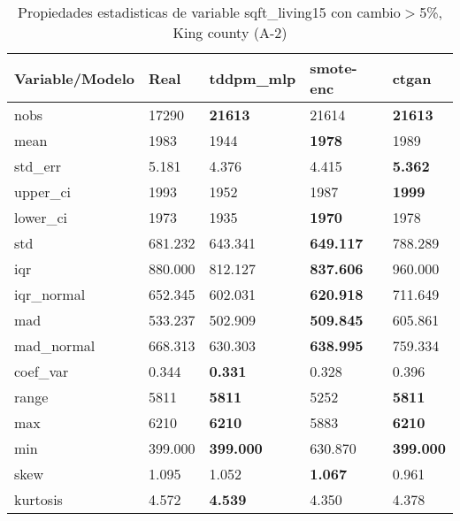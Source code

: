 \begin{table}[H]
\centering
\fontsize{8}{14}\selectfont
\caption{Propiedades estadisticas de variable sqft\_living15 con cambio\ensuremath{>}5\%, King county (A-2)}
\label{table-stats-king county-a-2-sqft_living15-short}
\begin{tabular}{|l|m{10em}|m{10em}|m{10em}|m{10em}|}
\hline
 \rowcolor[gray]{0.8}
Variable/Modelo & Real & tddpm\_mlp & smote-enc & ctgan \\
\hline nobs & 17290 & \bfseries 21613 & \cellcolor[rgb]{0.9, 0.54, 0.52} 21614 & \bfseries 21613 \\
\hline mean & 1983 & \cellcolor[rgb]{0.9, 0.54, 0.52} 1944 & \bfseries 1978 & 1989 \\
\hline std\_err & 5.181 & \cellcolor[rgb]{0.9, 0.54, 0.52} 4.376 & 4.415 & \bfseries 5.362 \\
\hline upper\_ci & 1993 & \cellcolor[rgb]{0.9, 0.54, 0.52} 1952 & 1987 & \bfseries 1999 \\
\hline lower\_ci & 1973 & \cellcolor[rgb]{0.9, 0.54, 0.52} 1935 & \bfseries 1970 & 1978 \\
\hline std & 681.232 & 643.341 & \bfseries 649.117 & \cellcolor[rgb]{0.9, 0.54, 0.52} 788.289 \\
\hline iqr & 880.000 & 812.127 & \bfseries 837.606 & \cellcolor[rgb]{0.9, 0.54, 0.52} 960.000 \\
\hline iqr\_normal & 652.345 & 602.031 & \bfseries 620.918 & \cellcolor[rgb]{0.9, 0.54, 0.52} 711.649 \\
\hline mad & 533.237 & 502.909 & \bfseries 509.845 & \cellcolor[rgb]{0.9, 0.54, 0.52} 605.861 \\
\hline mad\_normal & 668.313 & 630.303 & \bfseries 638.995 & \cellcolor[rgb]{0.9, 0.54, 0.52} 759.334 \\
\hline coef\_var & 0.344 & \bfseries 0.331 & 0.328 & \cellcolor[rgb]{0.9, 0.54, 0.52} 0.396 \\
\hline range & 5811 & \bfseries 5811 & \cellcolor[rgb]{0.9, 0.54, 0.52} 5252 & \bfseries 5811 \\
\hline max & 6210 & \bfseries 6210 & \cellcolor[rgb]{0.9, 0.54, 0.52} 5883 & \bfseries 6210 \\
\hline min & 399.000 & \bfseries 399.000 & \cellcolor[rgb]{0.9, 0.54, 0.52} 630.870 & \bfseries 399.000 \\
\hline skew & 1.095 & 1.052 & \bfseries 1.067 & \cellcolor[rgb]{0.9, 0.54, 0.52} 0.961 \\
\hline kurtosis & 4.572 & \bfseries 4.539 & \cellcolor[rgb]{0.9, 0.54, 0.52} 4.350 & 4.378 \\

\end{tabular}
\end{table}
